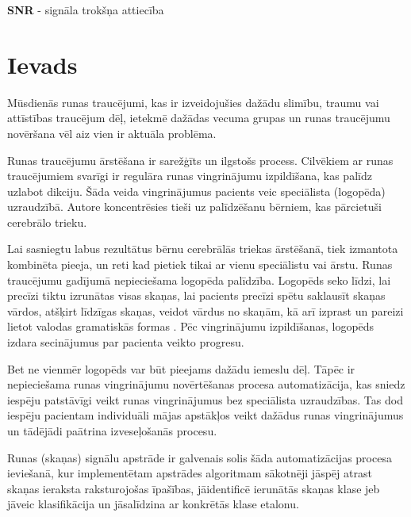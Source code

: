 \documentclass[12pt,paper=A4]{report}
\begin{document}
\textbf{SNR} - signāla trokšņa attiecība

\chapter*{Ievads}
Mūsdienās runas traucējumi, kas ir izveidojušies dažādu slimību, traumu vai attīstības traucējum dēļ, ietekmē dažādas vecuma grupas un runas traucējumu novēršana vēl aiz vien ir aktuāla problēma. 

Runas traucējumu ārstēšana ir sarežģīts un ilgstošs process. Cilvēkiem ar runas traucējumiem svarīgi ir regulāra runas vingrinājumu izpildīšana, kas palīdz uzlabot dikciju. Šāda veida vingrinājumus pacients veic speciālista (logopēda) uzraudzībā.
Autore koncentrēsies tieši uz palīdzēšanu bērniem, kas pārcietuši cerebrālo trieku.

Lai sasniegtu labus rezultātus bērnu cerebrālās triekas  ārstēšanā, tiek  izmantota kombinēta pieeja, un reti kad pietiek tikai ar vienu speciālistu vai ārstu. Runas traucējumu gadījumā nepieciešama logopēda palīdzība. Logopēds seko līdzi, lai precīzi tiktu izrunātas visas skaņas, lai pacients precīzi spētu saklausīt skaņas vārdos, atšķirt līdzīgas skaņas, veidot vārdus no skaņām, kā arī izprast un pareizi lietot valodas gramatiskās formas \cite{dtw30}.  Pēc vingrinājumu izpildīšanas, logopēds izdara secinājumus par pacienta veikto progresu.

Bet ne vienmēr logopēds var būt pieejams dažādu iemeslu dēļ. Tāpēc ir nepieciešama runas vingrinājumu novērtēšanas procesa automatizācija, kas sniedz iespēju patstāvīgi veikt runas vingrinājumus bez speciālista uzraudzības. Tas dod iespēju pacientam individuāli mājas apstākļos veikt dažādus runas vingrinājumus un tādējādi paātrina izveseļošanās procesu.

Runas (skaņas) signālu apstrāde ir galvenais solis šāda automatizācijas procesa ieviešanā, kur implementētam apstrādes algoritmam sākotnēji jāspēj atrast skaņas ieraksta raksturojošas īpašības, jāidentificē ierunātās skaņas klase jeb jāveic klasifikācija un jāsalīdzina ar konkrētās klase etalonu.
\end{document}
